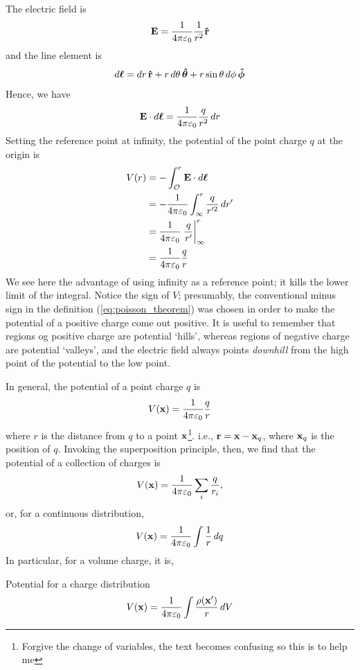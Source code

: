 		 The electric field is
		 \[
			 \vb{E} = \frac{1}{4\pi\varepsilon_0} \frac{1}{r^2}\vu{r}  
		 \]
		 and the line element is
		 \[
			 \dd{\vb* \ell} = \dd{r}\vu{r} + r\dd{\theta}\vu*{\theta} + r\sin\theta\dd{\phi}\vu*{\phi}
		 \]
		 Hence, we have
		 \[
			 \vb{E}\cdot \dd{\vb* \ell} = \frac{1}{4\pi\varepsilon_0} \frac{q}{r^2} \dd{r}
		 \]
		 Setting the reference point at infinity, the potential of the point charge $q$ at the origin is
		 \begin{align*}
		     V(r) 
			 &=
			 -\int_{\mathcal{O}}^{r}\vb{E}\cdot \dd{\vb* \ell}\\
			 &=
			 -\frac{1}{4\pi\epsz} \int_{\infty}^r \frac{q}{r'^2}\dd{r'} \\
			 &=
			 \frac{1}{4\pi\epsz}\eval{\frac{q}{r'}}^r_\infty\\
			 &=
			 \frac{1}{4\pi\epsz} \frac{q}{r} 
		 \end{align*}
		 We see here the advantage of using infinity as a reference point; it kills the lower limit
		 of the integral. Notice the sign of $V$; presumably, the conventional minus sign in the definition (\ref{eq:poisson_theorem})
		 was chosen in order to make the potential of a positive charge come out positive. It is useful to remember that regions og positive
		 charge are potential `hills', whereas regions of negative charge are potential	`valleys', and the electric field always points
		\textit{downhill} from the high point of the potential to the low point.
		
		In general, the potential of a point charge $q$ is
		\begin{equation}
		   V(\vb x) = \frac{1}{4\pi\varepsilon_0} \frac{q}{r}   
		\end{equation}
		where $r$ is the distance from $q$ to a point $\vb x$\footnote{Forgive the change of variables, the text becomes confusing so this is to help me}.
		i.e., $\vb r = \vb{x} - \vb{x}_q$, where $\vb{x}_q$ is the position of $q$. Invoking the superposition principle, then, we find that the potential
		of a collection of charges is 
		\begin{equation}
		    V(\vb x) = \frac{1}{4\pi\varepsilon_0} \sum_i \frac{q}{r_i},
		\end{equation}
		or, for a continuous distribution,
		\begin{equation}
			V(\vb x) = \frac{1}{4\pi\varepsilon_0}\int \frac{1}{r} \dd{q}
		\end{equation}
		In particular, for a volume charge, it is,
		\begin{theorem}{Potential for a charge distribution}
			\begin{equation}\label{eq:charge_potential}
				V(\vb x) = \frac{1}{4\pi\varepsilon_0}\int \frac{\rho(\vb x')}{r}\dd{V}  
			\end{equation}
		\end{theorem}
		
